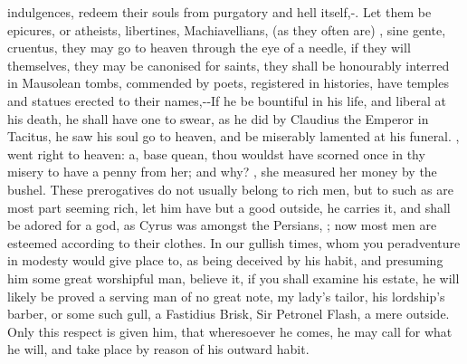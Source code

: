 {{indulgences, redeem their souls from purgatory and hell itself,-. Let them be epicures, or atheists, libertines,
Machiavellians, (as they often are) ,
sine gente, cruentus, they may go to heaven through the eye of a
needle, if they will themselves, they may be canonised for saints, they
shall be honourably interred in Mausolean tombs, commended by
poets, registered in histories, have temples and statues erected to
their names,--If he be bountiful in
his life, and liberal at his death, he shall have one to swear, as he
did by Claudius the Emperor in Tacitus, he saw his soul go to heaven,
and be miserably lamented at his funeral. , went right to
heaven: a, base quean, thou wouldst have scorned once in thy
misery to have a penny from her; and why? , she
measured her money by the bushel. These prerogatives do not usually
belong to rich men, but to such as are most part seeming rich, let him
have but a good outside, he carries it, and shall be adored for a
god, as Cyrus was amongst the Persians, 
; now most men are esteemed according to their
clothes. In our gullish times, whom you peradventure in modesty would
give place to, as being deceived by his habit, and presuming him some
great worshipful man, believe it, if you shall examine his estate, he
will likely be proved a serving man of no great note, my lady's tailor,
his lordship's barber, or some such gull, a Fastidius Brisk, Sir
Petronel Flash, a mere outside. Only this respect is given him, that
wheresoever he comes, he may call for what he will, and take place by
reason of his outward habit.

}}
